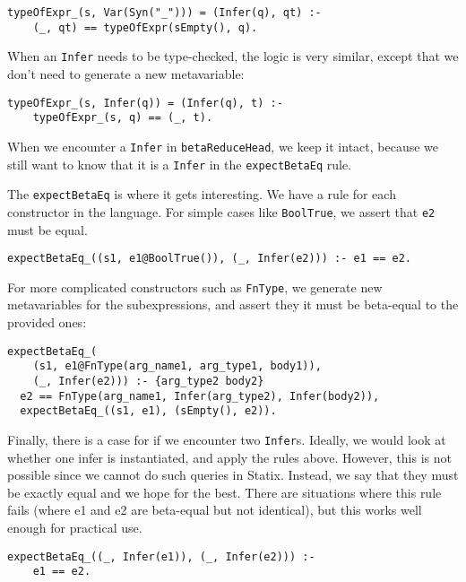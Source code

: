 \begin{lstlisting}
typeOfExpr_(s, Var(Syn("_"))) = (Infer(q), qt) :-
	(_, qt) == typeOfExpr(sEmpty(), q).
\end{lstlisting}
When an \verb|Infer| needs to be type-checked, the logic is very similar, except that we don't need to generate a new metavariable:

\begin{lstlisting}
typeOfExpr_(s, Infer(q)) = (Infer(q), t) :-
	typeOfExpr_(s, q) == (_, t).
\end{lstlisting}
When we encounter a \verb|Infer| in \verb|betaReduceHead|, we keep it intact, because we still want to know that it is a \verb|Infer| in the \verb|expectBetaEq| rule. 

The \verb|expectBetaEq| is where it gets interesting. We have a rule for each constructor in the language. For simple cases like \verb|BoolTrue|, we assert that \verb|e2| must be equal.
\begin{lstlisting}
expectBetaEq_((s1, e1@BoolTrue()), (_, Infer(e2))) :- e1 == e2.
\end{lstlisting}
For more complicated constructors such as \verb|FnType|, we generate new metavariables for the subexpressions, and assert they it must be beta-equal to the provided ones:
\begin{lstlisting}
expectBetaEq_(
	(s1, e1@FnType(arg_name1, arg_type1, body1)), 
	(_, Infer(e2))) :- {arg_type2 body2}
  e2 == FnType(arg_name1, Infer(arg_type2), Infer(body2)),
  expectBetaEq_((s1, e1), (sEmpty(), e2)).
\end{lstlisting}

Finally, there is a case for if we encounter two \verb|Infer|s. Ideally, we would look at whether one infer is instantiated, and apply the rules above. However, this is not possible since we cannot do such queries in Statix. Instead, we say that they must be exactly equal and we hope for the best. There are situations where this rule fails (where e1 and e2 are beta-equal but not identical), but this works well enough for practical use.
\begin{lstlisting}
expectBetaEq_((_, Infer(e1)), (_, Infer(e2))) :-
    e1 == e2.
\end{lstlisting}
